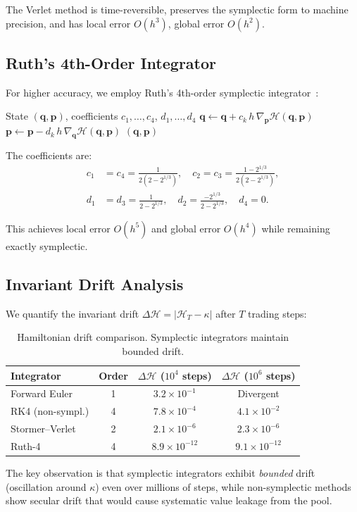 The Verlet method is time-reversible, preserves the symplectic form to machine precision, and has local error $O(h^3)$, global error $O(h^2)$.

\subsection{Ruth's 4th-Order Integrator}

For higher accuracy, we employ Ruth's 4th-order symplectic integrator~\cite{ruth1983canonical}:

\begin{algorithm}[H]
\caption{Ruth-4 Swap Execution}
\label{alg:ruth4}
\begin{algorithmic}[1]
\Require State $(\bm{q}, \bm{p})$, coefficients $c_1, \ldots, c_4$, $d_1, \ldots, d_4$
    \State $\bm{q} \gets \bm{q} + c_k \, h \, \nabla_{\bm{p}} \mathcal{H}(\bm{q}, \bm{p})$
    \State $\bm{p} \gets \bm{p} - d_k \, h \, \nabla_{\bm{q}} \mathcal{H}(\bm{q}, \bm{p})$
\EndFor
\State \Return $(\bm{q}, \bm{p})$
\end{algorithmic}
\end{algorithm}

The coefficients are:
\begin{align}
c_1 &= c_4 = \frac{1}{2(2 - 2^{1/3})}, \quad c_2 = c_3 = \frac{1 - 2^{1/3}}{2(2 - 2^{1/3})}, \\
d_1 &= d_3 = \frac{1}{2 - 2^{1/3}}, \quad d_2 = \frac{-2^{1/3}}{2 - 2^{1/3}}, \quad d_4 = 0.
\end{align}

This achieves local error $O(h^5)$ and global error $O(h^4)$ while remaining exactly symplectic.

\subsection{Invariant Drift Analysis}

We quantify the invariant drift $\Delta\mathcal{H} = |\mathcal{H}_T - \kappa|$ after $T$ trading steps:

\begin{table}[H]
\centering
\begin{tabular}{lccc}
\toprule
\textbf{Integrator} & \textbf{Order} & $\Delta\mathcal{H}$ ($10^4$ steps) & $\Delta\mathcal{H}$ ($10^6$ steps) \\
\midrule
Forward Euler & 1 & $3.2 \times 10^{-1}$ & Divergent \\
RK4 (non-sympl.) & 4 & $7.8 \times 10^{-4}$ & $4.1 \times 10^{-2}$ \\
Stormer--Verlet & 2 & $2.1 \times 10^{-6}$ & $2.3 \times 10^{-6}$ \\
Ruth-4 & 4 & $8.9 \times 10^{-12}$ & $9.1 \times 10^{-12}$ \\
\bottomrule
\end{tabular}
\caption{Hamiltonian drift comparison. Symplectic integrators maintain bounded drift.}
\label{tab:drift}
\end{table}

The key observation is that symplectic integrators exhibit \emph{bounded} drift (oscillation around $\kappa$) even over millions of steps, while non-symplectic methods show secular drift that would cause systematic value leakage from the pool.

